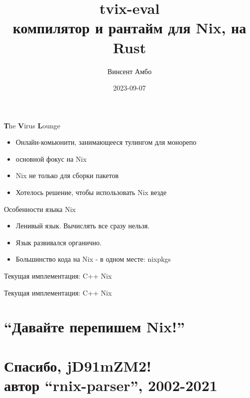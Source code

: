 \documentclass[12pt]{beamer}
\title{tvix-eval \\ компилятор и рантайм для Nix, на Rust}
\date{2023-09-07}
\author{Винсент Амбо}
\institute{TVL}
\newenvironment{code}{\ttfamily}{\par}
\begin{document}
  \begin{frame}
    \begin{center}
      \titlepage
    \end{center}
  \end{frame}

  \begin{frame}{\textbf{Т}he \textbf{V}irus \textbf{L}ounge}
    \begin{itemize}
    \item Онлайн-комьюнити, занимающееся тулингом для монорепо
    \item основной фокус на Nix
    \item Nix не только для сборки пакетов
    \item Хотелось решение, чтобы использовать Nix везде
    \end{itemize}
  \end{frame}

  \begin{frame}{Особенности языка Nix}
    \begin{itemize}
    \item Ленивый язык. Вычислять все сразу нельзя.
    \item Язык развивался органично.
    \item Большинство кода на Nix - в одном месте: \begin{code}nixpkgs\end{code}
    \end{itemize}
  \end{frame}

  \begin{frame}{Текущая имплементация: C++ Nix}
    
  \end{frame}

  \begin{frame}{Текущая имплементация: C++ Nix}
    
  \end{frame}

  \section{``Давайте перепишем Nix!''}

  \section*{Спасибо, jD91mZM2!\\\normalsize{автор ``rnix-parser'', 2002-2021}}
\end{document}
